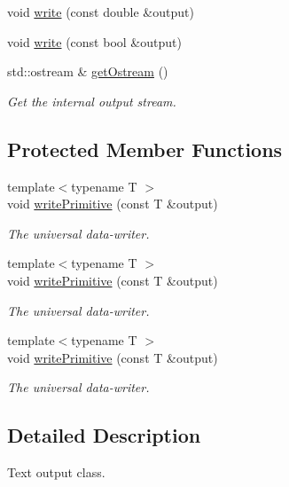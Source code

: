 \begin{DoxyCompactItemize}
\item 
void \mbox{\hyperlink{classENSEM_1_1TextWriter_af276971ecba157a3867e53ec909e543f}{write}} (const double \&output)
\item 
void \mbox{\hyperlink{classENSEM_1_1TextWriter_a3e99ec247c2bd70e5b4361bbb0264daf}{write}} (const bool \&output)
\item 
std\+::ostream \& \mbox{\hyperlink{classENSEM_1_1TextWriter_a40ade2e6c44ba267efdce5fb70909362}{get\+Ostream}} ()
\begin{DoxyCompactList}\small\item\em Get the internal output stream. \end{DoxyCompactList}\end{DoxyCompactItemize}
\subsection*{Protected Member Functions}
\begin{DoxyCompactItemize}
\item 
{\footnotesize template$<$typename T $>$ }\\void \mbox{\hyperlink{classENSEM_1_1TextWriter_aca159ff3db64ed918f7e4ddfed7a6d53}{write\+Primitive}} (const T \&output)
\begin{DoxyCompactList}\small\item\em The universal data-\/writer. \end{DoxyCompactList}\item 
{\footnotesize template$<$typename T $>$ }\\void \mbox{\hyperlink{classENSEM_1_1TextWriter_aca159ff3db64ed918f7e4ddfed7a6d53}{write\+Primitive}} (const T \&output)
\begin{DoxyCompactList}\small\item\em The universal data-\/writer. \end{DoxyCompactList}\item 
{\footnotesize template$<$typename T $>$ }\\void \mbox{\hyperlink{classENSEM_1_1TextWriter_aca159ff3db64ed918f7e4ddfed7a6d53}{write\+Primitive}} (const T \&output)
\begin{DoxyCompactList}\small\item\em The universal data-\/writer. \end{DoxyCompactList}\end{DoxyCompactItemize}


\subsection{Detailed Description}
Text output class. 

